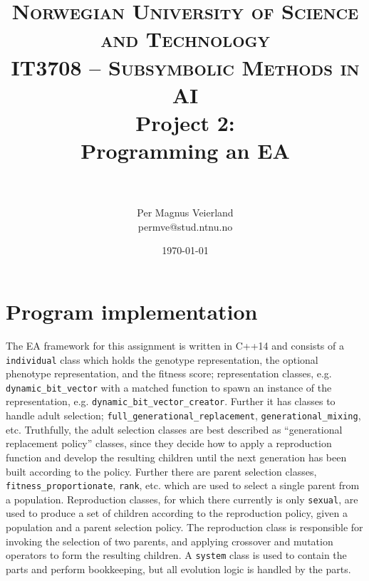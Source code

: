 

\usepackage{float}
\usepackage[htt]{hyphenat}
\usepackage{tabularx}


\title{
\normalfont \normalsize
\textsc{Norwegian University of Science and Technology\\IT3708 -- Subsymbolic Methods in AI}
\horrule{0.5pt} \\[0.4cm]
\huge Project 2:\\ Programming an \acf{EA}\\
\horrule{2pt} \\[0.5cm]
}

\author{Per Magnus Veierland\\permve@stud.ntnu.no}

\date{\normalsize\today}

\pgfplotsset{compat=1.5}




\fancyfoot[C]{}
\maketitle

\newpage
{} %
\setcounter{page}{1}

\section*{Program implementation}

The \ac{EA} framework for this assignment is written in \textsc{C++14} and consists of a \texttt{individual} class which holds the genotype representation, the optional phenotype representation, and the fitness score; representation classes, e.g. \texttt{dynamic\_bit\_vector} with a matched function to spawn an instance of the representation, e.g. \texttt{dynamic\_bit\_vector\_creator}. Further it has classes to handle adult selection; \texttt{full\_generational\_replacement}, \texttt{generational\_mixing}, etc. Truthfully, the adult selection classes are best described as ``generational replacement policy'' classes, since they decide how to apply a reproduction function and develop the resulting children until the next generation has been built according to the policy. Further there are parent selection classes, \texttt{fitness\_proportionate}, \texttt{rank}, etc. which are used to select a single parent from a population. Reproduction classes, for which there currently is only \texttt{sexual}, are used to produce a set of children according to the reproduction policy, given a population and a parent selection policy. The reproduction class is responsible for invoking the selection of two parents, and applying crossover and mutation operators to form the resulting children. A \texttt{system} class is used to contain the parts and perform bookkeeping, but all evolution logic is handled by the parts.

